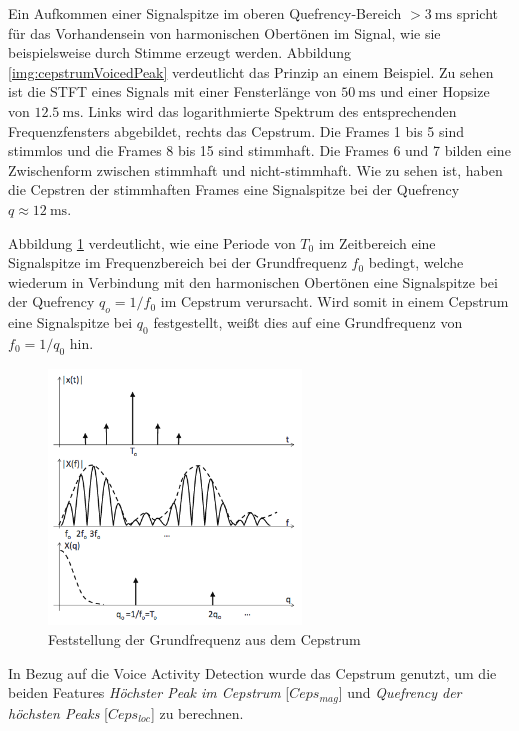 Ein Aufkommen einer Signalspitze im oberen Quefrency-Bereich $> \SI{3}{\milli\second}$ spricht für das Vorhandensein von harmonischen Obertönen im Signal, wie sie beispielsweise durch Stimme erzeugt werden. Abbildung \ref{img:cepstrumVoicedPeak} verdeutlicht das Prinzip an einem Beispiel. Zu sehen ist die STFT eines Signals mit einer Fensterlänge von $\SI{50}{\milli\second}$ und einer Hopsize von $\SI{12.5}{\milli\second}$. Links wird das logarithmierte Spektrum des entsprechenden Frequenzfensters abgebildet, rechts das Cepstrum. Die Frames 1 bis 5 sind stimmlos und die Frames 8 bis 15 sind stimmhaft. Die Frames 6 und 7 bilden eine Zwischenform zwischen stimmhaft und nicht-stimmhaft. Wie zu sehen ist, haben die Cepstren der stimmhaften Frames eine Signalspitze bei der Quefrency $q \approx \SI{12}{\milli\second}$.\cite[S. 16]{ricardo_ceps}

Abbildung \ref{img:cepstrumPitch} verdeutlicht, wie eine Periode von $T_0$ im Zeitbereich eine Signalspitze im Frequenzbereich bei der Grundfrequenz $f_0$ bedingt, welche wiederum in Verbindung mit den harmonischen Obertönen eine Signalspitze bei der Quefrency $q_o = 1 / f_0$ im Cepstrum verursacht. Wird somit in einem Cepstrum eine Signalspitze bei $q_0$ festgestellt, weißt dies auf eine Grundfrequenz von $f_0 = 1/q_0$ hin. \cite[S. 5]{cepstrumPitchTranslation}

\begin{figure}[h]
	\centering
	\includegraphics[width=0.6\textwidth]{bilder/cepstrumPitch.png}
	\caption[Feststellung der Grundfrequenz aus dem Cepstrum]{Feststellung der Grundfrequenz aus dem Cepstrum \cite[S. 5]{cepstrumPitchTranslation}}
	\label{img:cepstrumPitch}
\end{figure}

In Bezug auf die Voice Activity Detection wurde das Cepstrum genutzt, um die beiden Features \emph{Höchster Peak im Cepstrum} [$Ceps_{mag}$] und \emph{Quefrency der höchsten Peaks} [$Ceps_{loc}$] zu berechnen.

